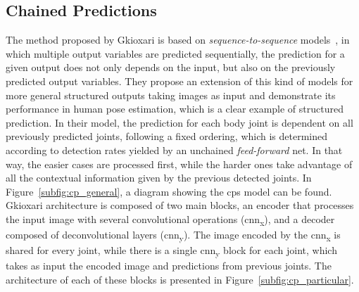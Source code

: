 \subsection{Chained Predictions}\label{subsec:cp}
The method proposed by Gkioxari \etal\cite{Gkioxari2016-ix} is based on \emph{sequence-to-sequence} models~\cite{sutskever2014sequence}, in which multiple output variables are predicted sequentially, \ie the prediction for a given output does not only depends on the input, but also on the previously predicted output variables. They propose an extension of this kind of models for more general structured outputs taking images as input and demonstrate its performance in human pose estimation, which is a clear example of structured prediction. In their model, the prediction for each body joint is dependent on all previously predicted joints, following a fixed ordering, which is determined according to detection rates yielded by an unchained \emph{feed-forward} net. In that way, the easier cases are processed first, while the harder ones take advantage of all the contextual information given by the previous detected joints. In Figure~\ref{subfig:cp_general}, a diagram showing the \glspl{cp} model can be found. Gkioxari \etal architecture is composed of two main blocks, an encoder that processes the input image with several convolutional operations (\gls{cnn}\textsubscript{x}), and a decoder composed of deconvolutional layers (\gls{cnn}\textsubscript{y}). The image encoded by the \gls{cnn}\textsubscript{x} is shared for every joint, while there is a single \gls{cnn}\textsubscript{y} block for each joint, which takes as input the encoded image and predictions from previous joints. The architecture of each of these blocks is presented in Figure~\ref{subfig:cp_particular}.

